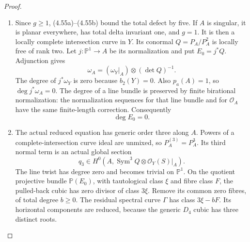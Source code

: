 \begin{proof}
\begin{enumerate}[label={$\langle1\rangle$\arabic*.},leftmargin=*]
\paragraph{The actual primary conductor and smoothness of $A$.}
Let $C_{A,\mathrm{sch}}$ be the primary component of the
actual image conductor supported on $A$. The primary
restriction maps of P4R.13, used in P4R.18, give
\[
                    g-1\le\chi(\mathcal O_{C_{A,\mathrm{sch}}}).
                                                            \tag{4.55a}
\]
The generic ordinary-triple conductor is the transverse
maximal ideal squared. Purity of the actual conductor
quotient identifies this primary ideal with $P_A^{(2)}$,
as in P4.31. The exact normalized conormal calculation of
P4.34 therefore gives
\[
 \chi(\mathcal O_{C_{A,\mathrm{sch}}})
       =5-\sum_p\bigl(\delta(A,p)+\tau_p-r_p\bigr).
                                                            \tag{4.55b}
\]
A planar point contributes exactly $5\delta(A,p)$, and a
nonplanar singular point with at most two branches contributes
at least seven. There cannot be three branches of $A$ at one
point: the identity
$\sum_p(r_p(C)-1)=2$ would then leave no identification for
the necessary connection with $B$; placing that connection
at the same point gives at least four branches and also
exceeds the identity.

\item Since $g\ge1$, (4.55a)--(4.55b) bound the total defect by
five. If $A$ is singular, it is planar everywhere, has total
delta invariant one, and $g=1$. It is then a locally complete
intersection curve in $Y$. Its conormal
$Q=P_A/P_A^2$ is locally free of rank two. Let
$j:\mathbb P^1\to A$ be its normalization and put $E_0=j^*Q$.
Adjunction gives
\[
             \omega_A=(\omega_Y|_A)\otimes(\det Q)^{-1}.
\]
The degree of $j^*\omega_Y$ is zero because $b_2(Y)=0$.
Also $p_a(A)=1$, so $\deg j^*\omega_A=0$. The degree of a
line bundle is preserved by finite birational normalization:
the normalization sequences for that line bundle and for
$\mathcal O_A$ have the same finite-length correction.
Consequently
\[
                              \deg E_0=0.                 \tag{4.55c}
\]

\item The actual reduced equation has generic order three along
$A$. Powers of a complete-intersection curve ideal are
unmixed, so $P_A^{(3)}=P_A^3$. Its third normal term is an
actual global section
\[
 q_3\in H^0\!\left(A,
          \operatorname{Sym}^3 Q\otimes\mathcal O_Y(S)|_A\right).
\]
The line twist has degree zero and becomes trivial on
$\mathbb P^1$. On the quotient projective bundle
$\mathbb P(E_0)$, with tautological class $\xi$ and fibre
class $F$, the pulled-back cubic has zero divisor of class
$3\xi$. Remove its common zero fibres, of total degree
$b\ge0$. The residual spectral curve $\Gamma$ has class
$3\xi-bF$. Its horizontal components are reduced, because
the generic $D_4$ cubic has three distinct roots.


\end{enumerate}
\end{proof}
